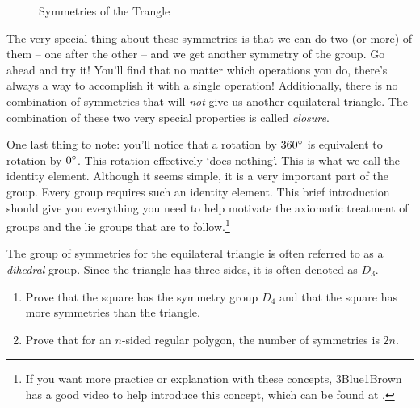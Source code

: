 \begin{figure}[H]

    \caption{Symmetries of the Trangle}
    \label{fig:sym tri}
\end{figure}
    The very special thing about these symmetries is that we can do two (or more) of them -- one after the other -- and we get another symmetry of the group. Go ahead and try it! You'll find that no matter which operations you do, there's always a way to accomplish it with a single operation! Additionally, there is no combination of symmetries that will \textit{not} give us another equilateral triangle. The combination of these two very special properties is called \textit{closure}.

    One last thing to note: you'll notice that a rotation by $360\degree$ is equivalent to rotation by $0\degree$. This rotation effectively `does nothing'. This is what we call the identity element. Although it seems simple, it is a very important part of the group. Every group requires such an identity element. This brief introduction should give you everything you need to help motivate the axiomatic treatment of groups and the \glspl{lie group} that are to follow.\footnote{If you want more practice or explanation with these concepts, 3Blue1Brown has a good video to help introduce this concept, which can be found at \cite{3blue1brown_eulers_2017}.}

\begin{exercise}
The group of symmetries for the equilateral triangle is often referred to as a \textit{dihedral} group. Since the triangle has three sides, it is often denoted as $D_3$. 
\begin{enumerate}
    \item Prove that the square has the symmetry group $D_4$ and that the square has more symmetries than the triangle.
    \item Prove that for an $n$-sided regular polygon, the number of symmetries is $2n$.
\end{enumerate}
\end{exercise}

